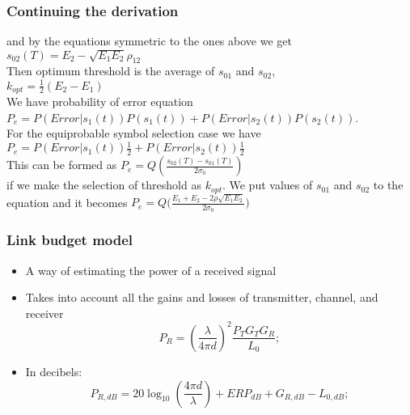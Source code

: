 \documentclass{beamer}
\begin{document}
\begin{frame}
\frametitle{ Continuing the derivation}
and by the equations symmetric to the ones above we get
$ s_{02}(T)=E_2 - \sqrt{E_1 E_2} \rho_{12}$\\
Then optimum threshold is the average of $s_{01}$ and $s_{02}$,\\
$ k_{opt}=\frac{1}{2}(E_2 - E_1)$\\
We have probability of error equation
$P_e = P(Error|s_1(t)) P(s_1(t)) + P(Error|s_2(t)) P(s_2(t))$.\\
For the equiprobable symbol selection case we have \\
$P_e = P(Error|s_1(t)) \frac{1}{2} + P(Error|s_2(t)) \frac{1}{2}$\\
This can be formed as
$P_e=Q(\frac{s_{02}(T)-s_{01}(T)}{2 \sigma_0})$ \\
if we make the selection of threshold as $k_{opt}$.
We put values of $s_{01}$ and $s_{02}$ to the equation and it becomes
$P_e=Q(\frac{E_1+E_2-2\rho \sqrt{E_1 E_2}}{2 \sigma_0}\bigg)$

\end{frame}


\begin{frame}
	\frametitle{Link budget model}
	\begin{itemize}
		\item A way of estimating the power of a received signal
		\item Takes into account all the gains and losses of transmitter, channel, and receiver
		\begin{equation}
			P_R = \left(\frac{\lambda}{4 \pi d}\right)^2 \frac{P_T G_T G_R}{L_0};
		\end{equation}
		\item In decibels:
		\begin{equation}
			P_{R, dB} = 20\log_{10}\left(\frac{4 \pi d}{\lambda}\right) + {ERP}_{dB} + G_{R, dB} - L_{0, dB};
		\end{equation}
	\end{itemize}
\end{frame}
\end{document}
